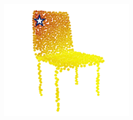 \documentclass[letterpaper]{article}
\begin{document}
\begin{figure}[htbp]
\begin{center}
\begin{minipage}[b]{0.8\linewidth}
\begin{center}
\begin{minipage}[b]{0.12\linewidth}
\begin{center}
\end{center}
\end{minipage}
\begin{minipage}[b]{0.12\linewidth}
\begin{center}
\includegraphics[width=1.0\linewidth]{images/atten_pic/chair_feature_3.png}
\end{center}
\end{minipage}\\
\begin{minipage}[b]{0.15\linewidth}
\begin{center}
\end{center}
\end{minipage}
\begin{minipage}[b]{0.12\linewidth}
\begin{center}

\end{center}
\end{minipage}
\end{center}
\end{minipage}
\end{center}
\end{figure}
\end{document}
